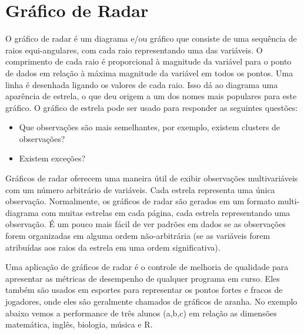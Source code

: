 \documentclass[
]{book}
\providecommand{\tightlist}{%
  \setlength{\itemsep}{0pt}\setlength{\parskip}{0pt}}
\begin{document}
\hypertarget{gruxe1fico-de-radar}{%
\section{Gráfico de Radar}\label{gruxe1fico-de-radar}}

O gráfico de radar é um diagrama e/ou gráfico que consiste de uma sequência de raios equi-angulares, com cada raio representando uma das variáveis. O comprimento de cada raio é proporcional à magnitude da variável para o ponto de dados em relação à máxima magnitude da variável em todos os pontos. Uma linha é desenhada ligando os valores de cada raio. Isso dá ao diagrama uma aparência de estrela, o que deu origem a um dos nomes mais populares para este gráfico. O gráfico de estrela pode ser usado para responder as seguintes questões:

\begin{itemize}
\tightlist
\item
  Que observações são mais semelhantes, por exemplo, existem clusters de observações?
\item
  Existem exceções?
\end{itemize}

Gráficos de radar oferecem uma maneira útil de exibir observações multivariáveis com um número arbitrário de variáveis. Cada estrela representa uma única observação. Normalmente, os gráficos de radar são gerados em um formato multi-diagrama com muitas estrelas em cada página, cada estrela representando uma observação. É um pouco mais fácil de ver padrões em dados se as observações forem organizadas em alguma ordem não-arbitrária (se as variáveis forem atribuídas aos raios da estrela em uma ordem significativa).

Uma aplicação de gráficos de radar é o controle de melhoria de qualidade para apresentar as métricas de desempenho de qualquer programa em curso. Eles também são usados em esportes para representar os pontos fortes e fracos de jogadores, onde eles são geralmente chamados de gráficos de aranha. No exemplo abaixo vemos a performance de três alunos (a,b,c) em relação as dimensões matemática, inglês, biologia, música e R.
\end{document}
